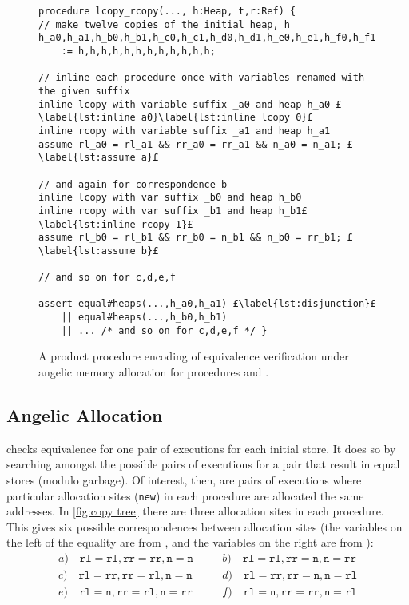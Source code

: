 \documentclass[runningheads,a4paper]{llncs}
\newcommand*{\news}{\texttt{new}}
\begin{document}
\begin{figure}[htbp]%
\centering%
\noindent\begin{lstlisting}[style=Boogie,firstnumber=auto,name=copyex]
procedure lcopy_rcopy(..., h:Heap, t,r:Ref) {
// make twelve copies of the initial heap, h
h_a0,h_a1,h_b0,h_b1,h_c0,h_c1,h_d0,h_d1,h_e0,h_e1,h_f0,h_f1
    := h,h,h,h,h,h,h,h,h,h,h,h;

// inline each procedure once with variables renamed with the given suffix
inline lcopy with variable suffix _a0 and heap h_a0 £\label{lst:inline a0}\label{lst:inline lcopy 0}£
inline rcopy with variable suffix _a1 and heap h_a1
assume rl_a0 = rl_a1 && rr_a0 = rr_a1 && n_a0 = n_a1; £\label{lst:assume a}£

// and again for correspondence b
inline lcopy with var suffix _b0 and heap h_b0
inline rcopy with var suffix _b1 and heap h_b1£\label{lst:inline rcopy 1}£
assume rl_b0 = rl_b1 && rr_b0 = n_b1 && n_b0 = rr_b1; £\label{lst:assume b}£

// and so on for c,d,e,f

assert equal#heaps(...,h_a0,h_a1) £\label{lst:disjunction}£
    || equal#heaps(...,h_b0,h_b1)
    || ... /* and so on for c,d,e,f */ }
\end{lstlisting}
\caption{A product procedure encoding of equivalence verification under angelic memory allocation for procedures \copylr{} and \copyrl{}.\label{fig:product}}
\end{figure}

\subsection{Angelic Allocation}

\Tool{} checks equivalence for one pair of executions for each initial store. It does so by searching amongst the possible pairs of executions for a pair that result in equal stores (modulo garbage). Of interest, then, are pairs of executions where particular allocation sites (\news{}) in each procedure are allocated the same addresses. In \cref{fig:copy tree} there are three allocation sites in each procedure.  This gives six possible correspondences between allocation sites (the variables on the left of the equality are from \copylr{}, and the variables on the right are from \copyrl{}):
\[\begin{aligned}
  a)\quad \mathtt{rl} = \mathtt{rl}, \mathtt{rr} = \mathtt{rr}, \mathtt{n} = \mathtt{n} &&\quad
  b)\quad \mathtt{rl} = \mathtt{rl}, \mathtt{rr} = \mathtt{n}, \mathtt{n} = \mathtt{rr} \\
  c)\quad \mathtt{rl} = \mathtt{rr}, \mathtt{rr} = \mathtt{rl}, \mathtt{n} = \mathtt{n} &&\quad
  d)\quad \mathtt{rl} = \mathtt{rr}, \mathtt{rr} = \mathtt{n}, \mathtt{n} = \mathtt{rl} \\
  e)\quad \mathtt{rl} = \mathtt{n}, \mathtt{rr} = \mathtt{rl}, \mathtt{n} = \mathtt{rr} &&\quad
  f)\quad \mathtt{rl} = \mathtt{n}, \mathtt{rr} = \mathtt{rr}, \mathtt{n} = \mathtt{rl}
\end{aligned}\]
\end{document}
